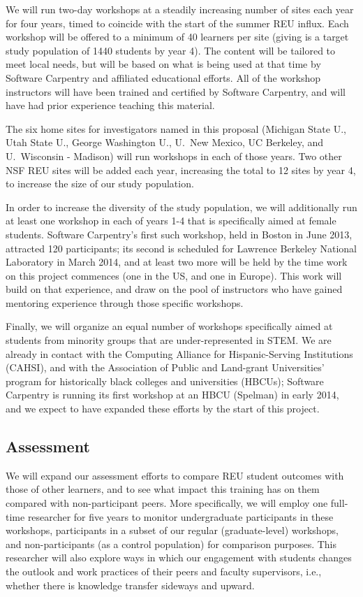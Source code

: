 \documentclass[11pt]{article}
\begin{document}
We will run two-day workshops at a steadily increasing number of sites
each year for four years, timed to coincide with the start of the
summer REU influx.  Each workshop will be offered to a minimum of 40
learners per site (giving is a target study population of 1440
students by year 4).  The content will be tailored to meet local
needs, but will be based on what is being used at that time by
Software Carpentry and affiliated educational efforts.  All of the
workshop instructors will have been trained and certified by Software
Carpentry, and will have had prior experience teaching this material.

The six home sites for investigators named in this proposal (Michigan
State U., Utah State U., George Washington U., U.\ New Mexico, UC
Berkeley, and U.\ Wisconsin - Madison) will run workshops in each of
those years.  Two other NSF REU sites will be added each year,
increasing the total to 12 sites by year 4, to increase the size of
our study population.

In order to increase the diversity of the study population, we will
additionally run at least one workshop in each of years 1-4 that is
specifically aimed at female students.  Software Carpentry's first
such workshop, held in Boston in June 2013, attracted 120
participants; its second is scheduled for Lawrence Berkeley National
Laboratory in March 2014, and at least two more will be held by the
time work on this project commences (one in the US, and one in
Europe).  This work will build on that experience, and draw on the
pool of instructors who have gained mentoring experience through those
specific workshops.

Finally, we will organize an equal number of workshops specifically
aimed at students from minority groups that are under-represented in
STEM.  We are already in contact with the Computing Alliance for
Hispanic-Serving Institutions (CAHSI), and with the Association of
Public and Land-grant Universities' program for historically black
colleges and universities (HBCUs); Software Carpentry is running its
first workshop at an HBCU (Spelman) in early 2014, and we expect to
have expanded these efforts by the start of this project.

\subsection{Assessment}

We will expand our assessment efforts to compare REU student outcomes
with those of other learners, and to see what impact this training has
on them compared with non-participant peers.  More specifically, we
will employ one full-time researcher for five years to monitor
undergraduate participants in these workshops, participants in a
subset of our regular (graduate-level) workshops, and non-participants
(as a control population) for comparison purposes.  This researcher
will also explore ways in which our engagement with students changes
the outlook and work practices of their peers and faculty supervisors,
i.e., whether there is knowledge transfer sideways and upward.
\end{document}
